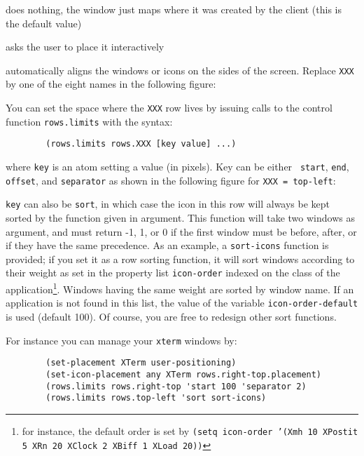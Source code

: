 \begin{description}

\itemtt{()} does nothing, the window just maps where it was created
by the client (this is the default value)

 asks the user to place it interactively

 automatically aligns the windows or icons on the
sides of the screen. Replace {\tt XXX} by one of the eight names in the 
following figure:

\centerline{}

You can set the space where the {\tt XXX} row lives by issuing calls to the
control function \verb"rows.limits" with the syntax:

\begin{verbatim}
        (rows.limits rows.XXX [key value] ...)
\end{verbatim}

where {\tt key} is an atom setting a value (in pixels). Key can be either {\tt
start}, {\tt end}, {\tt offset}, and {\tt separator} as shown in the following
figure for {\tt XXX = top-left}:

\centerline{}

{\tt key} can also be {\tt sort}, in which case the icon in this row will
always be kept sorted by the function given in argument. This function will
take two windows as argument, and must return -1, 1, or 0 if the first window
must be before, after, or if they have the same precedence. As an example, a
{\tt sort-icons} function is provided; if you set it as a row sorting
function, it will sort windows according to their weight as set in the
property list {\tt icon-order} indexed on the class of the
application\footnote{for instance, the default order is set by {\tt (setq
icon-order '(Xmh 10 XPostit 5 XRn 20 XClock 2 XBiff 1 XLoad 20))}}. Windows
having the same weight are sorted by window name. If an application is not
found in this list, the value of the variable {\tt icon-order-default} is used
(default 100). Of course, you are free to redesign other sort functions.

\end{description}

For instance you can manage your \verb"xterm" windows by:

{\exemplefont\begin{verbatim}
        (set-placement XTerm user-positioning)
        (set-icon-placement any XTerm rows.right-top.placement)
        (rows.limits rows.right-top 'start 100 'separator 2)
        (rows.limits rows.top-left 'sort sort-icons)
\end{verbatim}}

